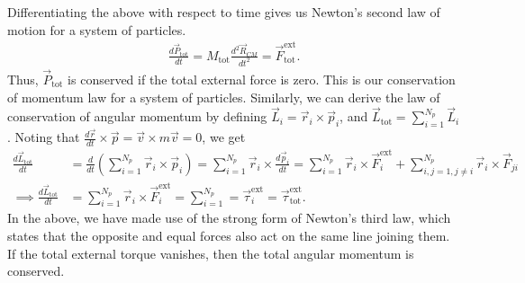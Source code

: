 Differentiating the above with respect to time gives us Newton's second law of motion for a system of particles.
\begin{align}
    \frac{d\vec{P}_{\text{tot}}}{dt} = M_{\text{tot}} \frac{d^{2}\vec{R}_{CM}}{dt^{2}} = \vec{F}_{\text{tot}}^{\text{ext}}.
\end{align}
Thus, $\vec{P}_{\text{tot}}$ is conserved if the total external force is zero. This is our conservation of momentum law for a system of particles. Similarly, we can derive the law of conservation of angular momentum by defining $\vec{L}_{i} = \vec{r}_{i} \times \vec{p}_{i}$, and $\vec{L}_{\text{tot}} = \sum_{i=1}^{N_{p}} \vec{L}_{i}$. Noting that $\frac{d\vec{r}}{dt} \times \vec{p} = \vec{v} \times m\vec{v} = 0$, we get
\begin{align}
    \frac{d\vec{L}_{\text{tot}}}{dt} &= \frac{d}{dt} \left( \sum_{i=1}^{N_{p}} \vec{r}_{i} \times \vec{p}_{i} \right) = \sum_{i=1}^{N_{p}} \vec{r}_{i} \times \frac{d\vec{p}_{i}}{dt} = \sum_{i=1}^{N_{p}} \vec{r}_{i} \times \vec{F}_{i}^{\text{ext}} + \sum_{i,j=1, j \neq i}^{N_{p}} \vec{r}_{i} \times \vec{F}_{ji} \\
    \implies \frac{d\vec{L}_{\text{tot}}}{dt} &= \sum_{i=1}^{N_{p}} \vec{r}_{i} \times \vec{F}_{i}^{\text{ext}} = \sum_{i=1}^{N_{p}} = \vec{\tau}_{i}^{\text{ext}} = \vec{\tau}_{\text{tot}}^{\text{ext}}.
\end{align}
In the above, we have made use of the strong form of Newton's third law, which states that the opposite and equal forces also act on the same line joining them. If the total external torque vanishes, then the total angular momentum is conserved.
